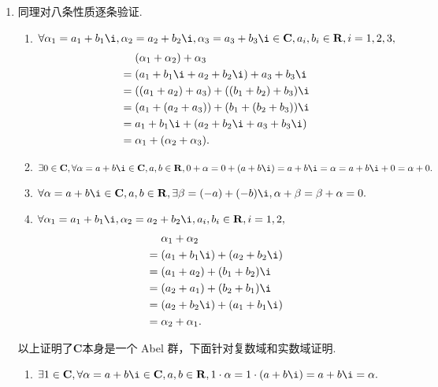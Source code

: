 \begin{solution}
\begin{enumerate}
        \item 同理对八条性质逐条验证.
                \begin{enumerate}
                    \item $\forall \alpha_1 = a_1+b_1\i , \alpha_2 = a_2+b_2\i , \alpha_3 = a_3+b_3\i \in \mathbf{C},a_i, b_i \in \mathbf{R}, i = 1, 2, 3,$
                    \begin{align*}
                        & (\alpha_1+\alpha_2)+\alpha_3 \\ ={} & (a_1+b_1\i+a_2+b_2\i)+a_3+b_3\i \\ ={} & ((a_1+a_2)+a_3)+((b_1+b_2)+b_3)\i \\ ={} & (a_1+(a_2+a_3))+(b_1+(b_2+b_3))\i \\={} & a_1+b_1\i+(a_2+b_2\i+a_3+b_3\i) \\ ={} & \alpha_1+(\alpha_2+\alpha_3).
                    \end{align*}

                    \item $\exists 0 \in \mathbf{C}, \forall \alpha = a+b\i \in \mathbf{C}, a, b \in \mathbf{R}, 0+\alpha = 0+(a+b\i) = a+b\i = \alpha = a+b\i+0 = \alpha +0.$

                    \item $\forall \alpha = a+b\i \in \mathbf{C}, a, b \in \mathbf{R}, \exists \beta = (-a)+(-b)\i, \alpha +\beta = \beta + \alpha = 0.$

                    \item $\forall \alpha_1 = a_1+b_1\i, \alpha_2 = a_2+b_2\i, a_i, b_i \in \mathbf{R}, i = 1, 2,$
                    \begin{align*}
                        & \alpha_1+\alpha_2 \\ ={} & (a_1+b_1\i)+(a_2+b_2\i) \\ ={} &(a_1+a_2)+(b_1+b_2)\i \\ ={} & (a_2+a_1)+(b_2+b_1)\i \\ ={} & (a_2+b_2\i)+(a_1+b_1\i) \\ ={} & \alpha_2+\alpha_1.
                    \end{align*}
                \end{enumerate}
                以上证明了$\mathbf{C}$本身是一个 Abel 群，下面针对复数域和实数域证明.
                \begin{enumerate}
                    \item $\exists 1 \in \mathbf{C}, \forall \alpha = a+b\i \in \mathbf{C}, a, b \in \mathbf{R}, 1 \cdot \alpha = 1 \cdot (a+b\i) = a+b\i = \alpha.$


\end{enumerate}
\end{enumerate}
\end{solution}
